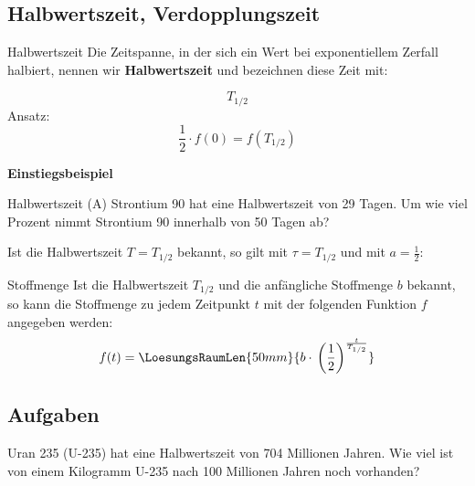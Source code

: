 \subsection{Halbwertszeit, Verdopplungszeit}


\begin{definition}{Halbwertszeit}{}
Die Zeitspanne, in der sich ein Wert bei exponentiellem Zerfall halbiert, nennen wir
\textbf{Halbwertszeit} und bezeichnen diese Zeit mit:

$$T_{1/2}$$
Ansatz:
$$\frac12 \cdot{} f(0) = f(T_{1/2})$$
\end{definition}
\newpage

\textbf{Einstiegsbeispiel}

\begin{beispiel}{Halbwertszeit (A)}{}
Strontium 90 hat eine Halbwertszeit von 29 Tagen. Um wie viel Prozent
nimmt Strontium 90 innerhalb von 50 Tagen ab?


\end{beispiel}



Ist die Halbwertszeit $T = T_{1/2}$ bekannt, so gilt mit
$\tau=T_{1/2}$ und mit $a=\frac12$:

\begin{gesetz}{Stoffmenge}{}
  Ist die Halbwertszeit $T_{1/2}$ und die anfängliche Stoffmenge $b$
  bekannt, so kann die Stoffmenge zu jedem Zeitpunkt $t$ mit der
  folgenden Funktion $f$ angegeben werden:
  \leserluft{}
  \leserluft{}  
  $$f(t) = \LoesungsRaumLen{50mm}{b\cdot{}\left(\frac12\right)^{\frac{t}{T_{1/2}}}}$$
\end{gesetz}
\newpage



\subsection*{Aufgaben}
Uran 235 (U-235) hat eine Halbwertszeit von 704 Millionen Jahren. Wie viel ist
von einem Kilogramm U-235 nach 100 Millionen Jahren noch vorhanden?


